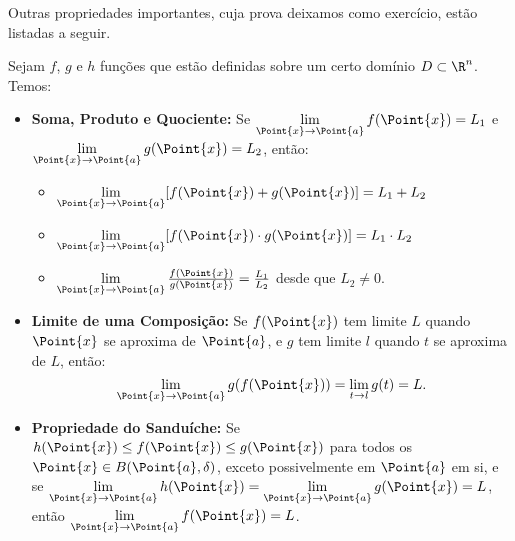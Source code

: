 Outras propriedades importantes, cuja prova deixamos como exercício, estão listadas a seguir.
\begin{properties}{}{}
Sejam $f$, $g$ e $h$ funções que estão definidas sobre um certo domínio $D\subset\R^n$. Temos:
\begin{itemize}[label=\color{chapterscolor}\textbullet,itemsep=10pt]
\item \textbf{Soma, Produto e Quociente:} Se     
    $\lim\limits_{\Point{x}\to\Point{a}} f(\Point{x})= L_1$ e $\lim\limits_{\Point{x}\to\Point{a}} g(\Point{x})= L_2$, então:
    \begin{itemize}[label=\color{chapterscolor}\textbf{--},itemsep=10pt]
        \item $\lim\limits_{\Point{x}\to\Point{a}} [f(\Point{x}) + g(\Point{x})] = L_1 + L_2$
        \item $\lim\limits_{\Point{x}\to\Point{a}} [f(\Point{x}) \cdot g(\Point{x})] = L_1 \cdot L_2$
        \item $\lim\limits_{\Point{x}\to\Point{a}} \frac{f(\Point{x})}{g(\Point{x})} = \frac{L_1}{L_2}$ desde que $L_2 \neq 0$. 
    \end{itemize}
    
\item \textbf{Limite de uma Composição:} Se $f(\Point{x})$ tem limite $L$ quando $\Point{x}$ se aproxima de $\Point{a}$, e $g$ tem limite $l$ quando $t$ se aproxima de $L$, então:
\[\lim\limits_{\Point{x}\to\Point{a}} g(f(\Point{x})) = \lim\limits_{t\to l} g(t) = L. \]
    
    
\item \textbf{Propriedade do Sanduíche:} Se $h(\Point{x}) \leq f(\Point{x}) \leq g(\Point{x})$ para todos os $\Point{x}\in B(\Point{a},\delta)$, exceto possivelmente em $\Point{a}$ em si, e se $\lim\limits_{\Point{x}\to\Point{a}} h(\Point{x}) = \lim\limits_{\Point{x}\to\Point{a}} g(\Point{x}) = L$, então $\lim\limits_{\Point{x}\to\Point{a}} f(\Point{x}) = L$.
    
\end{itemize}

\end{properties}


